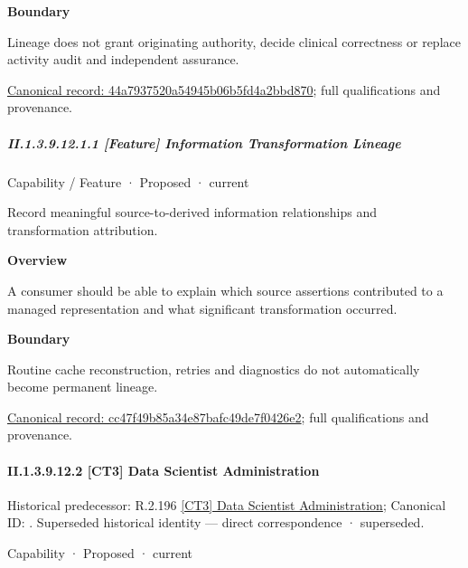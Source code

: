 \textbf{Boundary}



Lineage does not grant originating authority, decide clinical correctness or replace activity audit and independent assurance.


{\footnotesize \href{../../../../../../../continuum/strategy/capability/44a7937520a54945b06b5fd4a2bbd870.md}{Canonical record: 44a7937520a54945b06b5fd4a2bbd870}; full qualifications and provenance.}\par
\subparagraph*{II.1.3.9.12.1.1 [Feature] Information Transformation Lineage}
\label{navigation:II.1.3.9.12.1.1}

\label{element:cc47f49b85a34e87bafc49de7f0426e2}
{\small Capability / Feature · Proposed · current}\par

Record meaningful source-to-derived information relationships and transformation attribution.



\textbf{Overview}



A consumer should be able to explain which source assertions contributed to a managed representation and what significant transformation occurred.



\textbf{Boundary}



Routine cache reconstruction, retries and diagnostics do not automatically become permanent lineage.


{\footnotesize \href{../../../../../../../continuum/strategy/capability/feature/cc47f49b85a34e87bafc49de7f0426e2.md}{Canonical record: cc47f49b85a34e87bafc49de7f0426e2}; full qualifications and provenance.}\par
\paragraph*{II.1.3.9.12.2 [CT3] Data Scientist Administration}
\label{navigation:II.1.3.9.12.2}

{\small Historical predecessor: R.2.196 \hyperref[element:1cb497aec93c4b82ba7f5b622813e54e]{[CT3] Data Scientist Administration}; Canonical ID: \texttt{}. Superseded historical identity — direct correspondence · superseded.}\par
\label{element:3bb1a11fba234717bf40c9e6452f401a}
{\small Capability · Proposed · current}\par

